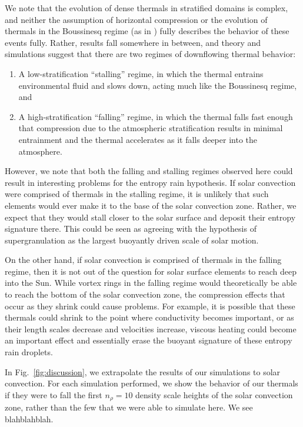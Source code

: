 \documentclass[twocolumn, amsmath, amsfonts, amssymb, trackchanges]{aastex62}
\newcommand{\LJ}{\citetalias{lecoanet&jeevanjee2018}}
\begin{document}
We note that the evolution of dense thermals in stratified domains is complex, and neither the assumption of horizontal compression \citep[as in e.g.][]{brandenburg2016} or the evolution of thermals in the Boussinesq regime (as in \LJ) fully describes the behavior of these events fully.
Rather, results fall somewhere in between, and theory and simulations suggest that there are two regimes of downflowing thermal behavior:
\begin{enumerate}
\item A low-stratification ``stalling'' regime, in which the thermal entrains environmental fluid and slows down, acting much like the Boussinesq regime, and
\item A high-stratification ``falling'' regime, in which the thermal falls fast enough that compression due to the atmospheric stratification results in minimal entrainment and the thermal accelerates as it falls deeper into the atmosphere.
\end{enumerate}

However, we note that both the falling and stalling regimes observed here could result in interesting problems for the entropy rain hypothesis. 
If solar convection were comprised of thermals in the stalling regime, it is unlikely that such elements would ever make it to the base of the solar convection zone.
Rather, we expect that they would stall closer to the solar surface and deposit their entropy signature there. 
This could be seen as agreeing with the hypothesis of supergranulation as the largest buoyantly driven scale of solar motion.

On the other hand, if solar convection is comprised of thermals in the falling regime, then it is not out of the question for solar surface elements to reach deep into the Sun.
While vortex rings in the falling regime would theoretically be able to reach the bottom of the solar convection zone, the compression effects that occur as they shrink could cause problems.
For example, it is possible that these thermals could shrink to the point where conductivity becomes important, or as their length scales decrease and velocities increase, viscous heating could become an important effect and essentially erase the buoyant signature of these entropy rain droplets.

In Fig.~\ref{fig:discussion}, we extrapolate the results of our simulations to solar convection.
For each simulation performed, we show the behavior of our thermals if they were to fall the first $n_\rho = 10$ density scale heights of the solar convection zone, rather than the few that we were able to simulate here.
We see blahblahblah.
\end{document}
